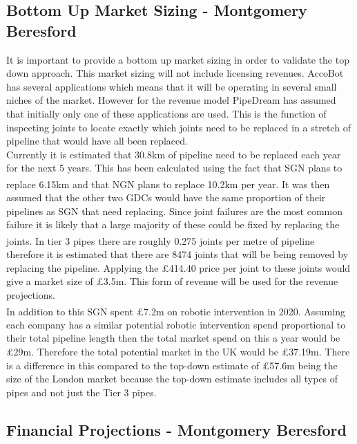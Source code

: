 \documentclass[11pt]{article}		%
\newcommand{\supercite}[1]{\textsuperscript{\cite{#1}}}		%
\begin{document}
            \subsection[Bottom Up Market Sizing]{Bottom Up Market Sizing - Montgomery Beresford} \label{bottomUp}
                It is important to provide a bottom up market sizing in order to validate the top down approach. This market sizing will not include licensing revenues.
	            AccoBot has several applications which means that it will be operating in several small niches of the market. However for the revenue model PipeDream has assumed that initially only one of these applications are used. This is the function of inspecting joints to locate exactly which joints need to be replaced in a stretch of pipeline that would have all been replaced. 
		 \\
		        Currently it is estimated that 30.8km of pipeline need to be replaced each year for the next 5 years. This has been calculated using the fact that SGN plans to replace 6.15km \supercite{SGN_Southern}\supercite{SGN_Scotland} and that NGN plans to replace 10.2km per year\supercite{NGN_decisions}. It was then assumed that the other two GDCs would have the same proportion of their pipelines as SGN that need replacing. Since joint failures are the most common failure it is likely that a large majority of these could be fixed by replacing the joints. In tier 3 pipes there are roughly 0.275 joints per metre of pipeline \supercite{SGN_Southern} therefore it is estimated that there are 8474 joints that will be being removed by replacing the pipeline. Applying the £414.40 price per joint to these joints would give a market size of £3.5m. This form of revenue will be used for the revenue projections.
		        \\
		        In addition to this SGN spent £7.2m on robotic intervention in 2020.\supercite{SGN_Scotland}\supercite{SGN_Southern} Assuming each company has a similar potential robotic intervention spend proportional to their total pipeline length then the total market spend on this a year would be £29m. Therefore the total potential market in the UK would be £37.19m. There is a difference in this compared to the top-down estimate of £57.6m being the size of the London market because the top-down estimate includes all types of pipes and not just the Tier 3 pipes.    
		 

	        
	        \subsection[Financial Projections]{Financial Projections - Montgomery Beresford}
		        	        
\end{document}

